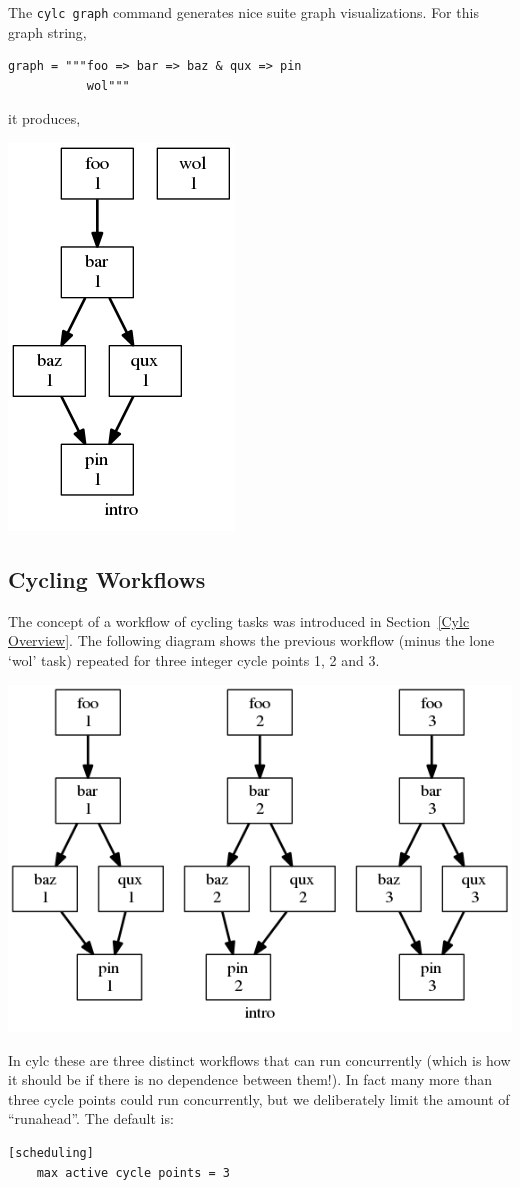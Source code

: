 The \lstinline=cylc graph= command generates nice suite graph visualizations.
For this graph string,

\begin{lstlisting}[language=suiterc]
graph = """foo => bar => baz & qux => pin
           wol"""
\end{lstlisting}

it produces,

\begin{center}
\includegraphics[width=0.2\columnwidth]{resources/intro-1.png} %
\end{center}

\subsection{Cycling Workflows}

The concept of a workflow of cycling tasks was introduced in Section~\ref{Cylc
Overview}.  The following diagram shows the previous workflow (minus the lone
`wol' task) repeated for three integer cycle points 1, 2 and 3.

\begin{center}
\includegraphics[width=0.5\columnwidth]{resources/intro.png} %
\end{center}

In cylc these are three distinct workflows that can run concurrently (which is
how it should be if there is no dependence between them!). In fact many more
than three cycle points could run concurrently, but we deliberately limit the
amount of ``runahead''. The default is:
\begin{lstlisting}
[scheduling]
    max active cycle points = 3
\end{lstlisting}


